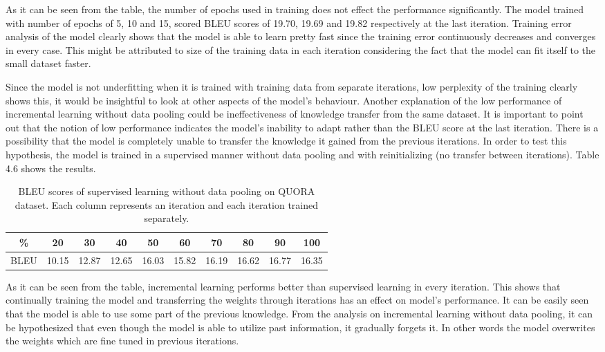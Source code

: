 As it can be seen from the table, the number of epochs used in training does not effect the performance significantly. The model trained with number of epochs of 5, 10 and 15, scored BLEU scores of 19.70, 19.69 and 19.82 respectively at the last iteration. Training error analysis of the model clearly shows that the model is able to learn pretty fast since the training error continuously decreases and converges in every case. This might be attributed to size of the training data in each iteration considering the fact that the model can fit itself to the small dataset faster.

Since the model is not underfitting when it is trained with training data from separate iterations, low perplexity of the training clearly shows this, it would be insightful to look at other aspects of the model's behaviour. Another explanation of the low performance of incremental learning without data pooling could be ineffectiveness of knowledge transfer from the same dataset. It is important to point out that the notion of low performance indicates the model's inability to adapt rather than the BLEU score at the last iteration. There is a possibility that the model is completely unable to transfer the knowledge it gained from the previous iterations. In order to test this hypothesis, the model is trained in a supervised manner without data pooling and with reinitializing (no transfer between iterations). Table 4.6 shows the results. 

\begin{table}[t]
\centering
\small
 \begin{tabular}{|c | c | c | c | c | c | c | c | c | c |} 
 \hline
 \% & 20 & 30 & 40 & 50 & 60 & 70 & 80 & 90 & 100 \\ [0.5ex] 
 \hline
  BLEU & 10.15 & 12.87 & 12.65 & 16.03 & 15.82 & 16.19 & 16.62 & 16.77 & 16.35  \\ 
 \hline
\end{tabular}
\caption{BLEU scores of supervised learning without data pooling on QUORA dataset. Each column represents an iteration and each iteration trained separately.}
\end{table}

As it can be seen from the table, incremental learning performs better than supervised learning in every iteration. This shows that continually training the model and transferring the weights through iterations has an effect on model's performance. It can be easily seen that the model is able to use some part of the previous knowledge. From the analysis on incremental learning without data pooling, it can be hypothesized that even though the model is able to utilize past information, it gradually forgets it. In other words the model overwrites the weights which are fine tuned in previous iterations.

